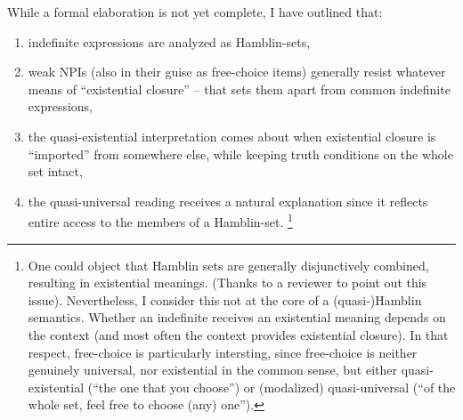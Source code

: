 \documentclass[output=paper,colorlinks,citecolor=brown,
]{langscibook}
\begin{document}
While a formal elaboration is not yet complete, I have outlined that: 

\begin{enumerate}[label=\roman*.]
\item indefinite expressions are analyzed as Hamblin-sets,
\item weak NPIs (also in their guise as free-choice items) generally resist whatever means of “existential closure” -- that sets them apart from common indefinite
expressions, 
\item the quasi-existential interpretation comes about when existential closure is “imported” from
somewhere else, while keeping truth conditions on the whole set intact,
\item the quasi-universal reading receives a natural explanation since it reflects entire access to the members of a Hamblin-set.%
\footnote{One could object that Hamblin sets are generally disjunctively combined, resulting in existential meanings. (Thanks to a reviewer to point out this issue). Nevertheless, I consider this not at the core of a (quasi-)Hamblin semantics. Whether an indefinite receives an existential meaning depends on the context (and most often the context provides existential closure). In that respect, free-choice is particularly intersting, since free-choice is neither genuinely universal, nor existential in the common sense, but either quasi-existential (“the one that you choose”) or (modalized) quasi-universal (“of the whole set, feel free to choose (any) one”).}
\end{enumerate}
\end{document}
